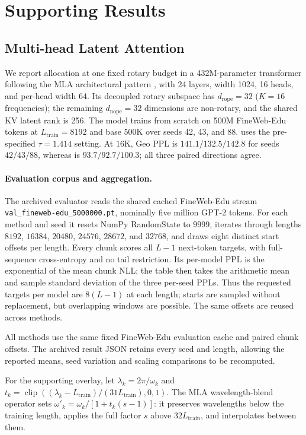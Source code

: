 \section{Supporting Results}

\subsection{Multi-head Latent Attention}
\label{sec:mla-results}

We report allocation at one fixed rotary budget in a 432M-parameter transformer following
the MLA architectural pattern \citep{deepseekv2}, with 24 layers, width 1024,
16 heads, and per-head width 64.
Its decoupled rotary
subspace has $d_{\mathrm{rope}}{=}32$ ($K{=}16$ frequencies); the remaining
$d_{\mathrm{nope}}{=}32$ dimensions are non-rotary, and the shared KV latent
rank is 256. The model trains from scratch on 500M FineWeb-Edu tokens
\citep{penedo2024fineweb} at
$L_{\mathrm{train}}{=}8192$ and base $500\mathrm{K}$ over seeds 42, 43, and
88. \evq{} uses the pre-specified $\tau=1.414$ setting.
At $16$K, Geo PPL is
$141.1/132.5/142.8$ for seeds $42/43/88$, whereas \evq{} is
$93.7/92.7/100.3$; all three paired directions agree.

\paragraph{Evaluation corpus and aggregation.}
The archived evaluator reads the shared cached FineWeb-Edu stream \texttt{val\_fineweb-edu\_5000000.pt}, nominally five million GPT-2 tokens. For each method and seed it resets NumPy RandomState to $9999$, iterates through lengths $8192$, $16384$, $20480$, $24576$, $28672$, and $32768$, and draws eight distinct start offsets per length. Every chunk scores all $L-1$ next-token targets, with full-sequence cross-entropy and no tail restriction. Its per-model PPL is the exponential of the mean chunk NLL; the table then takes the arithmetic mean and sample standard deviation of the three per-seed PPLs. Thus the requested targets per model are $8(L-1)$ at each length; starts are sampled without replacement, but overlapping windows are possible. The same offsets are reused across methods.

All methods use the same fixed FineWeb-Edu evaluation cache and paired chunk offsets. The archived result JSON retains every seed and length, allowing the reported means, seed variation and scaling comparisons to be recomputed.

For the supporting overlay, let $\lambda_k=2\pi/\omega_k$ and
$t_k=\operatorname{clip}((\lambda_k-L_{\mathrm{train}})/(31L_{\mathrm{train}}),0,1)$.
The MLA wavelength-blend operator sets
$\omega'_k=\omega_k/[1+t_k(s-1)]$: it preserves wavelengths below the training
length, applies the full factor $s$ above $32L_{\mathrm{train}}$, and interpolates
between them.

